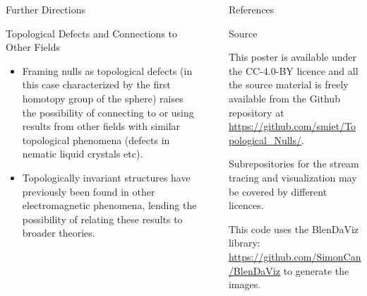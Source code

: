 \documentclass[final]{beamer}
\newlength{\sepwid}
\newlength{\onecolwid}
\newlength{\twocolwid}
\begin{document}
\begin{frame}[t]
\begin{columns}[t]
\begin{column}{\twocolwid}
\begin{columns}[t,totalwidth=\twocolwid]
\begin{column}{\onecolwid}
\begin{block}{\huge Further Directions}
  \begin{block}{Topological Defects and Connections to Other Fields}
    \begin{itemize}
      \item Framing nulls as topological defects
        (in this case characterized by the first homotopy group of the sphere)
        raises the possibility of connecting to or using results from
        other fields with similar topological phenomena
        (defects in nematic liquid crystals etc).
      \item Topologically invariant structures have previously been
        found in other electromagnetic phenomena, lending the possibility
        of relating these results to broader theories.
    \end{itemize}
  \end{block}  
  
\end{block}
\end{column}

\begin{column}{\sepwid}\end{column} %

\begin{column}{\onecolwid} %
\begin{block}{\huge References}

\nocite{*} %
\small{
\vspace{0.75in}}

\end{block}

\begin{block}{Source}
\begin{centering}
    \hfill
    \hfill
\end{centering}

	\vspace{1cm}
This poster is available under the  CC-4.0-BY  licence and all the source material is freely
available from the Github repository at \url{https://github.com/smiet/Topological_Nulls/}.

Subrepositories for the stream tracing and visualization may be covered by different licences. 

This code uses the BlenDaViz library: \url{https://github.com/SimonCan/BlenDaViz} to generate the images. 


\end{block}
\end{column}
\end{columns}
\end{column}
\end{columns}
\end{frame}
\end{document}
